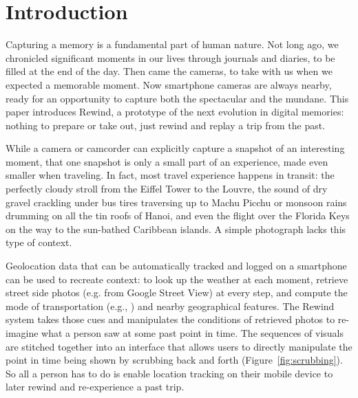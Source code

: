 \documentclass{sigchi}
\begin{document}


\section{Introduction}

Capturing a memory is a fundamental part of human nature. Not long ago, we chronicled significant moments in our lives through journals and diaries, to be filled at the end of the day. Then came the cameras, to take with us when we expected a memorable moment. Now smartphone cameras are always nearby, ready for an opportunity to capture both the spectacular and the mundane. This paper introduces Rewind, a prototype of the next evolution in digital memories: nothing to prepare or take out, just rewind and replay a trip from the past.
 
While a camera or camcorder can explicitly capture a snapshot of an interesting moment, that one snapshot is only a small part of an experience, made even smaller when traveling. In fact, most travel experience happens in transit: the perfectly cloudy stroll from the Eiffel Tower to the Louvre, the sound of dry gravel crackling under bus tires traversing up to Machu Picchu or monsoon rains drumming on all the tin roofs of Hanoi, and even the flight over the Florida Keys on the way to the sun-bathed Caribbean islands. A simple photograph lacks this type of context.
 
Geolocation data that can be automatically tracked and logged on a smartphone can be used to recreate context: to look up the weather at each moment, retrieve street side photos (e.g. from Google Street View) at every step, and compute the mode of transportation (e.g., \cite{zheng2008learning}) and nearby geographical features. The Rewind system takes those cues and manipulates the conditions of retrieved photos to re-imagine what a person saw at some past point in time. The sequences of visuals are stitched together into an interface that allows users to directly manipulate the point in time being shown by scrubbing back and forth (Figure~\ref{fig:scrubbing}). So all a person has to do is enable location tracking on their mobile device to later rewind and re-experience a past trip.
\end{document}
